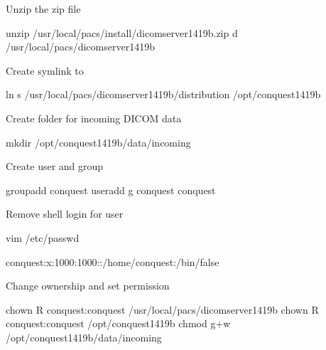 \documentclass[letterpaper,10pt,english]{sphinxmanual}
\begin{document}
Unzip the zip file

%
\begin{sphinxVerbatim}[commandchars=\\\{\}]
unzip /usr/local/pacs/install/dicomserver1419b.zip \PYGZhy{}d /usr/local/pacs/dicomserver1419b
\end{sphinxVerbatim}

Create symlink to 

%
\begin{sphinxVerbatim}[commandchars=\\\{\}]
ln \PYGZhy{}s /usr/local/pacs/dicomserver1419b/distribution /opt/conquest\PYGZhy{}14\PYGZhy{}19b
\end{sphinxVerbatim}

Create folder for incoming DICOM data

%
\begin{sphinxVerbatim}[commandchars=\\\{\}]
mkdir /opt/conquest\PYGZhy{}14\PYGZhy{}19b/data/incoming
\end{sphinxVerbatim}

Create user and group 

%
\begin{sphinxVerbatim}[commandchars=\\\{\}]
groupadd conquest
useradd \PYGZhy{}g conquest conquest
\end{sphinxVerbatim}

Remove shell login for user 

%
\begin{sphinxVerbatim}[commandchars=\\\{\}]
vim /etc/passwd
\end{sphinxVerbatim}

%
\begin{sphinxVerbatim}[commandchars=\\\{\}]
conquest:x:1000:1000::/home/conquest:/bin/false
\end{sphinxVerbatim}

Change ownership and set permission

%
\begin{sphinxVerbatim}[commandchars=\\\{\}]
chown \PYGZhy{}R conquest:conquest /usr/local/pacs/dicomserver1419b
chown \PYGZhy{}R conquest:conquest /opt/conquest\PYGZhy{}14\PYGZhy{}19b
chmod g+w /opt/conquest\PYGZhy{}14\PYGZhy{}19b/data/incoming
\end{sphinxVerbatim}
\end{document}
